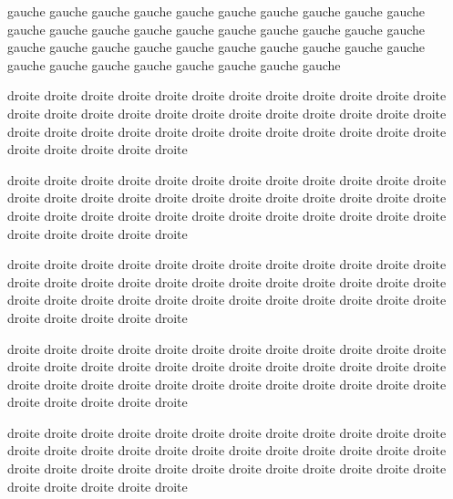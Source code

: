 \documentclass[12pt]{book}
\renewcommand{\edtext}[2]{}
\begin{document}
\begin{pages}
\begin{Leftside}
\begin{ledgroup}
gauche gauche gauche gauche gauche gauche gauche gauche gauche gauche gauche gauche gauche gauche gauche gauche gauche gauche gauche gauche gauche gauche gauche gauche gauche gauche gauche gauche gauche gauche gauche gauche gauche gauche gauche gauche gauche gauche\edtext{gauche}{\Afootnote{gauche gauche gauche gauche gauche gauche gauche gauche gauche gauche gauche gauche gauche gauche gauche gauche gauche gauche gauche gauche gauche gauche gauche gauche gauche gauche gauche gauche gauche gauche gauche gauche gauche gauche gauche}}
\end{ledgroup}
\pend
\endnumbering
\end{Leftside}
\begin{Rightside}
\beginnumbering
\pstart
\begin{ledgroup}
droite droite droite droite droite droite droite droite droite droite droite droite droite droite droite droite droite droite droite droite droite droite droite droite droite droite droite droite droite droite droite droite droite droite droite droite droite droite droite droite droite

droite droite droite droite droite droite droite droite droite droite droite droite droite droite droite droite droite droite droite droite droite droite droite droite droite droite droite droite droite droite droite droite droite droite droite droite droite droite droite droite droite 
\end{ledgroup}
\pend

\pstart
\begin{ledgroup}
droite droite droite droite droite droite droite droite droite droite droite droite droite droite droite droite droite droite droite droite droite droite droite droite droite droite droite droite droite droite droite droite droite droite droite droite droite droite droite droite droite

droite droite droite droite droite droite droite droite droite droite droite droite droite droite droite droite droite droite droite droite droite droite droite droite droite droite droite droite droite droite droite droite droite droite droite droite droite droite droite droite droite

droite droite droite droite droite droite droite droite droite droite droite droite droite droite droite droite droite droite droite droite droite droite droite droite droite droite droite droite droite droite droite droite droite droite droite droite droite droite droite droite droite 
\end{ledgroup}
\pend


\end{Rightside}
\end{pages}
\end{document}
